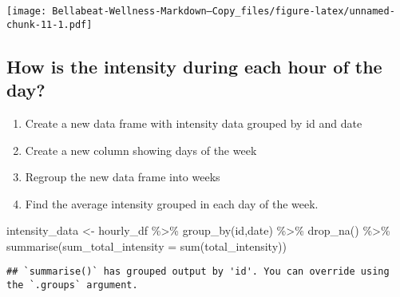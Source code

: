 \documentclass[
]{article}
\newenvironment{Shaded}{\begin{snugshade}}{\end{snugshade}}
\newcommand{\AttributeTok}[1]{\textcolor[rgb]{0.77,0.63,0.00}{#1}}
\newcommand{\FunctionTok}[1]{\textcolor[rgb]{0.00,0.00,0.00}{#1}}
\newcommand{\NormalTok}[1]{#1}
\newcommand{\OtherTok}[1]{\textcolor[rgb]{0.56,0.35,0.01}{#1}}
\newcommand{\SpecialCharTok}[1]{\textcolor[rgb]{0.00,0.00,0.00}{#1}}
\providecommand{\tightlist}{%
  \setlength{\itemsep}{0pt}\setlength{\parskip}{0pt}}
\begin{document}
\texttt{[image: Bellabeat-Wellness-Markdown---Copy\_files/figure-latex/unnamed-chunk-11-1.pdf]}

\hypertarget{how-is-the-intensity-during-each-hour-of-the-day}{%
\subsection{How is the intensity during each hour of the
day?}\label{how-is-the-intensity-during-each-hour-of-the-day}}

\begin{enumerate}
\def\labelenumi{\arabic{enumi}.}
\tightlist
\item
  Create a new data frame with intensity data grouped by id and date
\item
  Create a new column showing days of the week
\item
  Regroup the new data frame into weeks
\item
  Find the average intensity grouped in each day of the week.
\end{enumerate}

\begin{Shaded}
\begin{Highlighting}[]
\NormalTok{intensity\_data }\OtherTok{\textless{}{-}}\NormalTok{ hourly\_df }\SpecialCharTok{\%\textgreater{}\%} 
  \FunctionTok{group\_by}\NormalTok{(id,date) }\SpecialCharTok{\%\textgreater{}\%} 
  \FunctionTok{drop\_na}\NormalTok{() }\SpecialCharTok{\%\textgreater{}\%} 
  \FunctionTok{summarise}\NormalTok{(}\AttributeTok{sum\_total\_intensity =} \FunctionTok{sum}\NormalTok{(total\_intensity))}
\end{Highlighting}
\end{Shaded}

\begin{verbatim}
## `summarise()` has grouped output by 'id'. You can override using the `.groups` argument.
\end{verbatim}

\begin{Shaded}
\end{Shaded}
\end{document}
